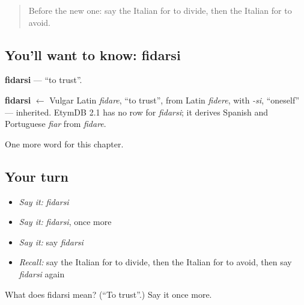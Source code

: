 \begin{quote}
Before the new one: say the Italian for to divide, then the Italian for to avoid.
\end{quote}

\subsection*{You'll want to know: fidarsi}
\textbf{fidarsi} — \textquotedblleft{}to trust\textquotedblright{}.

\begin{cousinweb}
\textbf{fidarsi} $\leftarrow$ Vulgar Latin \emph{fidare}, \textquotedblleft{}to trust\textquotedblright{}, from Latin \emph{fidere}, with \emph{-si}, \textquotedblleft{}oneself\textquotedblright{} — inherited. EtymDB 2.1 has no row for \emph{fidarsi}; it derives Spanish and Portuguese \emph{fiar} from \emph{fidare}.
\end{cousinweb}

\begin{grammarlens}[title={What you've built}]
One more word for this chapter.
\end{grammarlens}

\subsection*{Your turn}
\begin{itemize}
\raggedright
  \item \emph{Say it:} \emph{fidarsi}
  \item \emph{Say it:} \emph{fidarsi}, once more
  \item \emph{Say it:} say \emph{fidarsi}
  \item \emph{Recall:} say the Italian for to divide, then the Italian for to avoid, then say \emph{fidarsi} again
\end{itemize}

\begin{tcolorbox}[breakable,colback=teal!4,colframe=teal!35!black,title={Before you move on}]
What does fidarsi mean? (\textquotedblleft{}To trust\textquotedblright{}.) Say it once more.
\end{tcolorbox}
